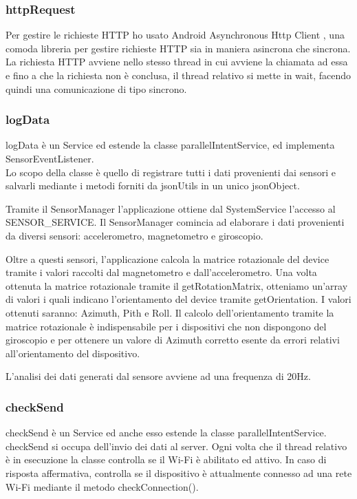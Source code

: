 \documentclass[12pt,a4paper,openright,twoside]{report}
\begin{document}
\subsubsection*{httpRequest}
Per gestire le richieste HTTP ho usato Android Asynchronous Http Client \cite{K20}, una comoda libreria per gestire richieste HTTP sia in maniera asincrona che sincrona.
La richiesta HTTP avviene nello stesso thread in cui avviene la chiamata ad essa e fino a che la richiesta non è conclusa, il thread relativo si mette in wait, facendo quindi una comunicazione di tipo sincrono.

\subsubsection*{logData}
logData è un Service ed estende la classe parallelIntentService, ed implementa SensorEventListener.\\
Lo scopo della classe è quello di registrare tutti i dati provenienti dai sensori e salvarli mediante i metodi forniti da jsonUtils in un unico jsonObject.

Tramite il SensorManager l'applicazione ottiene dal SystemService l'accesso al SENSOR\_SERVICE. Il SensorManager comincia ad elaborare i dati provenienti da diversi sensori: accelerometro, magnetometro e giroscopio.

Oltre a questi sensori, l'applicazione calcola la matrice rotazionale del device tramite i valori raccolti dal magnetometro e dall'accelerometro. Una volta ottenuta la matrice rotazionale tramite il getRotationMatrix, otteniamo un'array di valori i quali indicano l'orientamento del device tramite getOrientation.
I valori ottenuti saranno: Azimuth, Pith e Roll.
Il calcolo dell'orientamento tramite la matrice rotazionale è indispensabile per i dispositivi che non dispongono del giroscopio e per ottenere un valore di Azimuth corretto esente da errori relativi all'orientamento del dispositivo.

L'analisi dei dati generati dal sensore avviene ad una frequenza di 20Hz.


\subsubsection*{checkSend}
checkSend è un Service ed anche esso estende la classe parallelIntentService.
checkSend si occupa dell'invio dei dati al server. Ogni volta che il thread relativo è in esecuzione la classe controlla se il Wi-Fi è abilitato ed attivo. In caso di risposta affermativa, controlla se il dispositivo è attualmente connesso ad una rete Wi-Fi mediante il metodo checkConnection().
\end{document}
